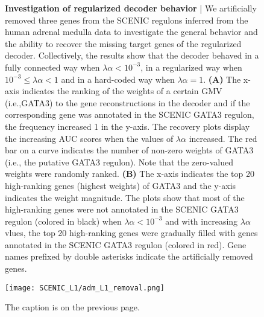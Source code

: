 \begin{figure}[b!]
    \caption{\small{\textbf{Investigation of regularized decoder behavior} | We artificially removed three genes from the SCENIC regulons inferred from the human adrenal medulla data to investigate the general behavior and the ability to recover the missing target genes of the regularized decoder. Collectively, the results show that the decoder behaved in a fully connected way when $\lambda\alpha < 10^{-3}$, in a regularized way when $10^{-3} \leq \lambda\alpha < 1$ and in a hard-coded way when $\lambda\alpha = 1$. \textbf{(A)} The x-axis indicates the ranking of the weights of a certain GMV (i.e.,GATA3) to the gene reconstructions in the decoder and if the corresponding gene was annotated in the SCENIC GATA3 regulon, the frequency increased 1 in the y-axis. The recovery plots display the increasing AUC scores when the values of $\lambda\alpha$ increased. The red bar on a curve indicates the number of non-zero weights of GATA3 (i.e., the putative GATA3 regulon). Note that the zero-valued weights were randomly ranked. \textbf{(B)} The x-axis indicates the top 20 high-ranking genes (highest weights) of GATA3 and the y-axis indicates the weight magnitude. The plots show that most of the high-ranking genes were not annotated in the SCENIC GATA3 regulon (colored in black) when $\lambda\alpha < 10^{-3}$ and with increasing $\lambda\alpha$ vlues, the top 20 high-ranking genes were gradually filled with genes annotated in the SCENIC GATA3 regulon (colored in red). Gene names prefixed by double asterisks indicate the artificially removed genes.}}
\end{figure}

\addtocounter{figure}{-1}
\begin{figure}[H]
    \centering
    \vspace{2.4cm}
    \texttt{[image: SCENIC\_L1/adm\_L1\_removal.png]}
    \caption{\small{The caption is on the previous page.}}
    \label{fig:L1_adm_removal}
\end{figure}

\newpage

